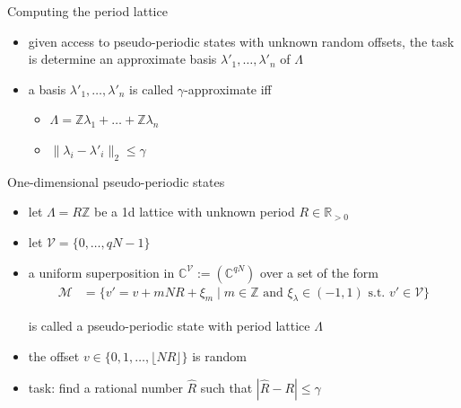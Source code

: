 \documentclass[slideColor]{prosper}
\newcommand{\Z}{\mathbb{Z}}
\renewcommand{\>}{\rangle}
\newcommand{\<}{\langle}
\begin{document}

\begin{slide}{Computing the period lattice}

\begin{itemize}
\item given access to pseudo-periodic states with unknown random offsets, the task is determine an approximate
basis $\lambda'_1,\ldots,\lambda'_n$ of $\Lambda$

\medskip
\item 
a basis $\lambda'_1,\ldots,\lambda'_n$ is called $\gamma$-approximate iff

\begin{itemize}
\medskip
\item $\Lambda=\mathbb{Z}\lambda_1 + \ldots + \mathbb{Z} \lambda_n$ 

\medskip
\item $\|\lambda_i - \lambda'_i \|_2 \le \gamma$
\end{itemize}
\end{itemize}

\end{slide}


\begin{slide}{One-dimensional pseudo-periodic states}
\vspace{-0.25cm}
\begin{itemize}
\item let $\Lambda=R \mathbb{Z}$ be a 1d lattice with unknown period $R\in\mathbb{R}_{>0}$

\medskip
\item let $\mathcal{V}=\{0,\ldots,qN-1\}$

\bigskip
\item a uniform superposition in $\mathbb{C}^\mathcal{V}:={(\mathbb{C}^{qN})}$ over a set of the form
\begin{align*}
\mathcal{M}  & = \{ v' = v + m N R + \xi_m \mid m\in\Z \text{ and } \xi_\lambda\in(-1,1) \text{ s.t. } v'\in\mathcal{V} \}
\end{align*}

is called a pseudo-periodic state with period lattice $\Lambda$

\bigskip
\item the offset $v\in\{0,1,\ldots,\lfloor N R \rfloor\}$ is random

\medskip
\item task: find a rational number $\hat{R}$ such that $|\hat{R}-R|\le \gamma$
\end{itemize}
\end{slide}
\end{document}
